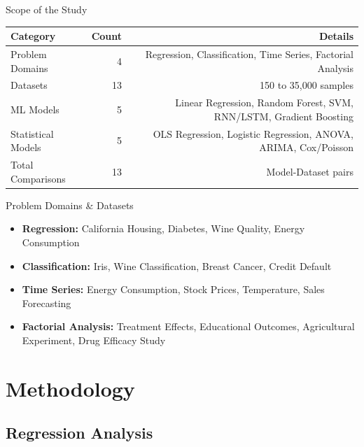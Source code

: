 \documentclass[aspectratio=169,10pt]{beamer}
\begin{document}
\begin{frame}{Scope of the Study}
\begin{center}
\begin{tabular}{lrr}
\toprule
\textbf{Category} & \textbf{Count} & \textbf{Details} \\
\midrule
Problem Domains & 4 & Regression, Classification, Time Series, Factorial Analysis \\
Datasets & 13 & 150 to 35,000 samples \\
ML Models & 5 & Linear Regression, Random Forest, SVM, RNN/LSTM, Gradient Boosting \\
Statistical Models & 5 & OLS Regression, Logistic Regression, ANOVA, ARIMA, Cox/Poisson \\
Total Comparisons & 13 & Model-Dataset pairs \\
\bottomrule
\end{tabular}
\end{center}

\vspace{0.5cm}

\begin{block}{Problem Domains \& Datasets}
\begin{itemize}
    \item \textbf{Regression:} California Housing, Diabetes, Wine Quality, Energy Consumption
    \item \textbf{Classification:} Iris, Wine Classification, Breast Cancer, Credit Default
    \item \textbf{Time Series:} Energy Consumption, Stock Prices, Temperature, Sales Forecasting
    \item \textbf{Factorial Analysis:} Treatment Effects, Educational Outcomes, Agricultural Experiment, Drug Efficacy Study
\end{itemize}
\end{block}
\end{frame}

\section{Methodology}

\subsection{Regression Analysis}
\end{document}
